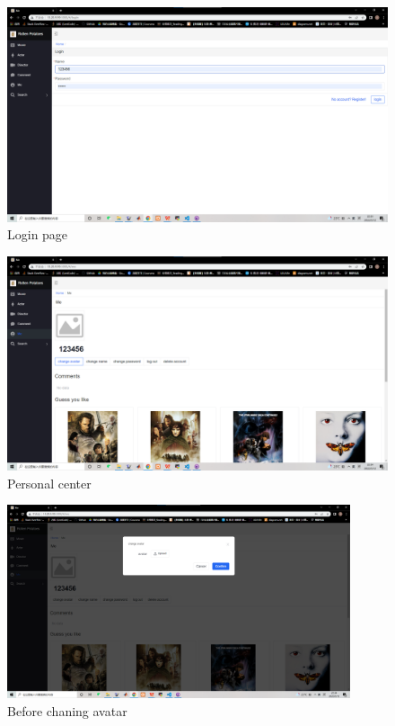 \begin{CJK*}{UTF8}{gbsn}
    \begin{figure}[htbp]
    \centering
    \includegraphics[width=1\textwidth]{res_login.png}
    \caption{Login page}
    \end{figure}
    
    \begin{figure}[htbp]
    \centering
    \includegraphics[width=1\textwidth]{res_ps.png}
    \caption{Personal center}
    \end{figure}
    
    \begin{figure}[htbp]
    \centering
    \includegraphics[width=0.9\textwidth]{res_avatar1.png}
    \caption{Before chaning avatar}
    \end{figure}
    

\end{CJK*}
